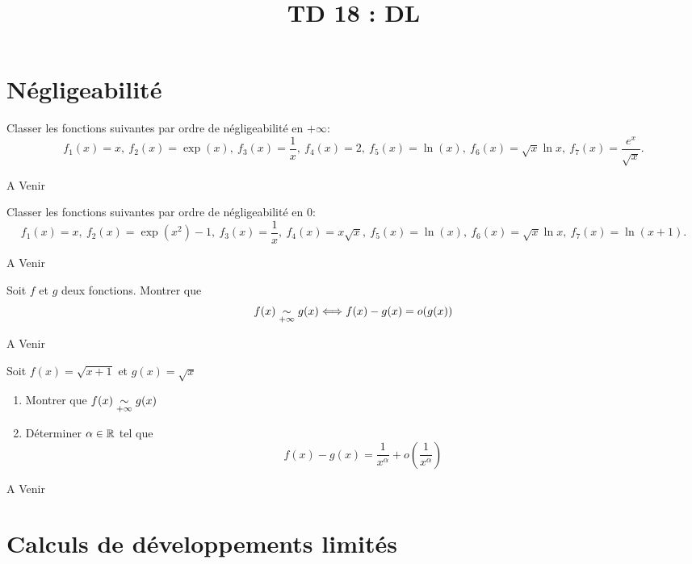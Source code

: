 \documentclass[a4paper, 11pt,reqno]{article}
\newcommand{\type}{TD }
\begin{document}
\title{\type 18 : DL}


\vspace{0.2cm}
\section{Négligeabilité}

\begin{exercice}
	Classer les fonctions suivantes par ordre de négligeabilité en $+\infty$:
	$$f_1(x)=x,\ f_2(x)=\exp(x),\ f_3(x)=\frac 1x,\ f_4(x)=2,\ f_5(x)=\ln(x),\ f_6(x)=\sqrt x\ln x,\ f_7(x)=\frac{e^x}{\sqrt x}.$$
\end{exercice}

\begin{correction}
	A Venir
\end{correction}

\begin{exercice}
	Classer les fonctions suivantes par ordre de négligeabilité en $0$:
	$$f_1(x)=x,\ f_2(x)=\exp(x^2)-1,\ f_3(x)=\frac 1x,\ f_4(x)=x\sqrt{x},\ f_5(x)=\ln(x),\ f_6(x)=\sqrt x\ln x,\ f_7(x)=\ln(x+1).$$
\end{exercice}

\begin{correction}
	A Venir
\end{correction}

\begin{exercice}
	Soit $f$ et $g$ deux fonctions. Montrer que
	$$f(x)\underset{+\infty}{\sim} g(x)  \Longleftrightarrow f(x)-g(x)=o(g(x))$$
\end{exercice}
\begin{correction}
	A Venir
\end{correction}

\begin{exercice}
	Soit $f(x)= \sqrt{x+1}$ et $g(x)=\sqrt{x}$
	\begin{enumerate}
		\item Montrer que $f(x)\underset{+\infty}{\sim} g(x)$
		\item Déterminer $\alpha \in \mathbb{R}$ tel que
		      $$ f(x) -g(x) =\frac{1}{x^\alpha} + o\left(\frac{1}{x^\alpha} \right)$$
	\end{enumerate}

\end{exercice}
\begin{correction}
	A Venir
\end{correction}
\noindent\section{\large{Calculs de d\'eveloppements limit\'es}}
\end{document}
